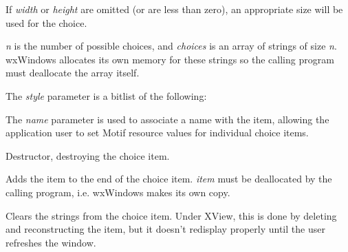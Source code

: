 If {\it width} or {\it height} are omitted (or are less than zero), an
appropriate size will be used for the choice.

{\it n} is the number of possible choices, and {\it choices} is an
array of strings of size {\it n}. wxWindows allocates its own memory
for these strings so the calling program must deallocate the array
itself.

The {\it style} parameter is a bitlist of the following:

\begin{twocollist}\itemsep=0pt
\end{twocollist}

The {\it name} parameter is used to associate a name with the item,
allowing the application user to set Motif resource values for
individual choice items.



Destructor, destroying the choice item.



Adds the item to the end of the choice item. {\it item} must be
deallocated by the calling program, i.e. wxWindows makes its own copy.



Clears the strings from the choice item. Under XView, this is done
by deleting and reconstructing the item, but it doesn't redisplay
properly until the user refreshes the window.



